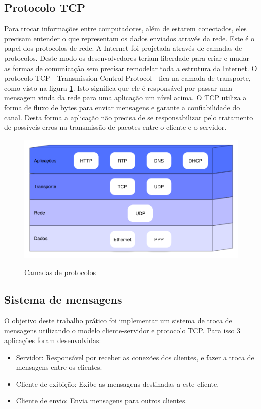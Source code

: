 \documentclass[a4paper,10pt]{article}
\begin{document}
\subsection{Protocolo TCP}
Para trocar informações entre computadores, além de estarem conectados, eles
precisam entender o que representam os dados enviados através da rede. Este é o
papel dos protocolos de rede. A Internet foi projetada através de camadas de
protocolos. Deste modo os desenvolvedores teriam liberdade para criar e mudar as
formas de comunicação sem precisar remodelar toda a estrutura da Internet. O
protocolo TCP - Transmission Control Protocol - fica na camada de transporte, como visto na figura
\ref{fig:protocolos}. Isto significa que ele é responsável por passar uma
mensagem vinda da rede para uma aplicação um nível acima. O TCP utiliza a forma
de fluxo de bytes para enviar mensagens e garante a confiabilidade do canal.
Desta forma a aplicação não precisa de se responsabilizar pelo tratamento de possíveis erros na
transmissão de pacotes entre o cliente e o servidor.

\begin{figure}[ht!]
\begin{center}
\includegraphics[scale=0.7]{imagens/protocolos.pdf}
\label{fig:protocolos}
\caption{Camadas de protocolos}
\end{center}
\end{figure}

\subsection{Sistema de mensagens}
O objetivo deste trabalho prático foi implementar um sistema de troca de mensagens
utilizando o modelo cliente-servidor e protocolo TCP. Para isso 3 aplicações
foram desenvolvidas:

\begin{itemize}
\item Servidor: Responsável por receber as conexões dos clientes, e fazer a
troca de mensagens entre os clientes.
\item Cliente de exibição: Exibe as mensagens destinadas a este cliente.
\item Cliente de envio: Envia mensagens para outros clientes.
\end{itemize}
\end{document}
